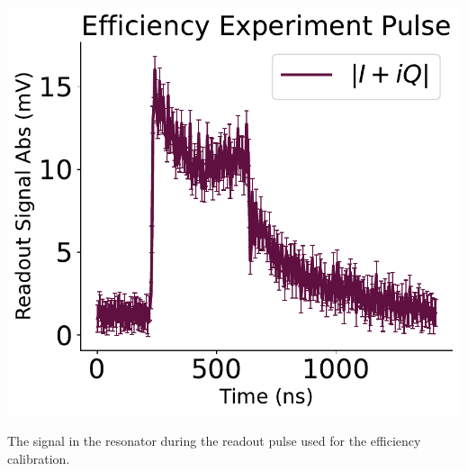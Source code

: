
\begin{marginfigure}
    \centering
    \includegraphics{Calibrations/Figures/Efficiency Experiment Pulse.pdf}
    \caption{The signal in the resonator during the readout pulse used for the efficiency calibration.}
    \label{fig:efficiency_pulse_shape}
\end{marginfigure}

